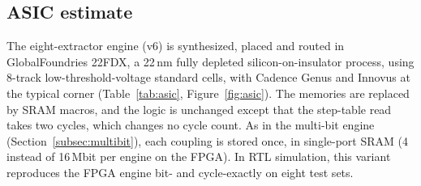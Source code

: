 \subsection{ASIC estimate}\label{subsec:asic}

The eight-extractor engine (v6) is synthesized, placed and routed in GlobalFoundries 22FDX, a 22\,nm fully depleted silicon-on-insulator process, using 8-track low-threshold-voltage standard cells, with Cadence Genus and Innovus at the typical corner (Table~\ref{tab:asic}, Figure~\ref{fig:asic}). The memories are replaced by SRAM macros, and the logic is unchanged except that the step-table read takes two cycles, which changes no cycle count. As in the multi-bit engine (Section~\ref{subsec:multibit}), each coupling is stored once, in single-port SRAM (4 instead of 16\,Mbit per engine on the FPGA). In RTL simulation, this variant reproduces the FPGA engine bit- and cycle-exactly on eight test sets.

